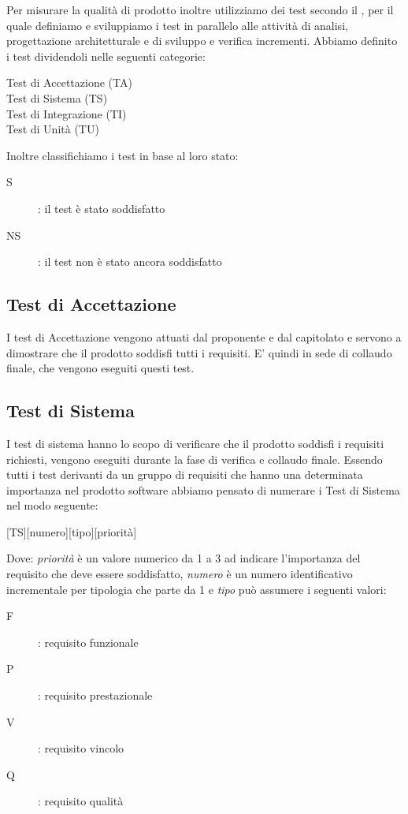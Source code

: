 \documentclass[../piano-di-qualifica.tex]{subfiles}
\begin{document}
Per misurare la qualità di prodotto inoltre utilizziamo dei test secondo il , per il quale definiamo e sviluppiamo i test in parallelo alle attività di analisi, progettazione architetturale e di sviluppo e verifica incrementi.
Abbiamo definito i test dividendoli nelle seguenti categorie:
\begin{description}
  \item [Test di Accettazione (TA)]
  \item [Test di Sistema (TS)]
  \item [Test di Integrazione (TI)]
  \item [Test di Unità (TU)]
\end{description}

Inoltre classifichiamo i test in base al loro stato:
\begin{description}
  \item [S]: il test è stato soddisfatto
  \item [NS]: il test non è stato ancora soddisfatto
\end{description}

\subsection{Test di Accettazione}%
\label{sub:test_di_accettazione}

I test di Accettazione vengono attuati dal proponente e dal capitolato e servono a dimostrare che il prodotto soddisfi tutti i requisiti.
E' quindi in sede di collaudo finale, che vengono eseguiti questi test.

\subsection{Test di Sistema}%
\label{sub:test_di_sistema}

I test di sistema hanno lo scopo di verificare che il prodotto soddisfi i requisiti richiesti, vengono eseguiti durante la fase di verifica e collaudo finale.
Essendo tutti i test derivanti da un gruppo di requisiti che hanno una determinata importanza nel prodotto software abbiamo pensato di numerare i Test di Sistema nel modo seguente:
\begin{center}
  [TS][numero][tipo][priorità]
\end{center}

Dove: \textit{priorità} è un valore numerico da 1 a 3 ad indicare l'importanza del requisito che deve essere soddisfatto, \textit{numero} è un numero identificativo incrementale per tipologia che parte da 1 e \textit{tipo} può assumere i seguenti valori:
\begin{description}
  \item [F]: requisito funzionale
  \item [P]: requisito prestazionale
  \item [V]: requisito vincolo
  \item [Q]: requisito qualità
\end{description}
\end{document}
